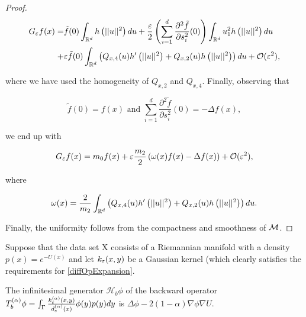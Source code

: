 \begin{proof}
\begin{equation*}\begin{aligned}
G_\varepsilon f(x)=&\tilde{f}(0)\int_{\mathbb{R}^d}h\left(||u||^2 \right)du + \frac{\varepsilon}{2}\left(\sum\limits_{i=1}^d \frac{\partial^2 \tilde{f}}{\partial s_i^2}(0) \right)\int_{\mathbb{R}^d}u_1^2 h\left(||u||^2\right)du \\
+&\varepsilon\tilde{f}(0)\int_{\mathbb{R}^d}\left(Q_{x,4}(u)h'\left(||u||^2\right) + Q_{x,2}(u)h\left(||u||^2\right)\right)du + \mathcal{O}(\varepsilon^2),
\end{aligned}\end{equation*}

where we have used the homogeneity of $Q_{x,2}$ and $Q_{x,4}$. Finally, observing that

\begin{equation*}
\tilde{f}(0) = f(x) \text{ and } \sum_{i=1}^d \frac{\partial^2 \tilde{f}}{\partial s_i^2}(0) = -\Delta f(x),
\end{equation*}

we end up with

\begin{equation*}
G_\varepsilon f(x)=m_0 f(x)+\varepsilon\frac{m_2}{2}\left(\omega(x)f(x)-\Delta f(x) \right)+\mathcal{O}(\varepsilon^2),
\end{equation*}

where

\begin{equation*}
\omega(x)=\frac{2}{m_2}\int_{\mathbb{R}^d}\left(Q_{x,4}(u)h'\left(||u||^2 \right) + Q_{x,2}(u)h\left(||u||^2 \right) \right)du.
\end{equation*}

Finally, the uniformity follows from the compactness and smoothness of $\mathcal{M}$.
\end{proof}


Suppose that the data set X consists of a Riemannian manifold with a density $p(x) = e^{-U(x)}$ and let $k_\varepsilon(x, y)$ be a Gaussian kernel (which clearly satisfies the requirements for \ref{diffOpExpansion}.

\begin{theorem}\label{thm:bFPO}
The infinitesimal generator $\mathcal{H}_b\phi$ of the backward operator $T_b^{(\alpha)}\phi = \int_\Gamma \frac{k_\varepsilon^{(\alpha)}(x,y)}{d_\varepsilon^{(\alpha)}(x)} \phi(y)p(y)dy $ is $\Delta \phi - 2(1-\alpha)\nabla\phi \nabla U$.
\end{theorem}

